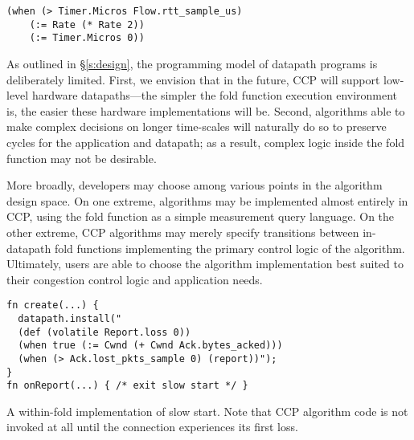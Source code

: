 {\footnotesize
\begin{verbatim}
(when (> Timer.Micros Flow.rtt_sample_us)
    (:= Rate (* Rate 2))
    (:= Timer.Micros 0))
\end{verbatim}
}

 As outlined in \S\ref{s:design}, the programming model of datapath programs is deliberately limited.
First, we envision that in the future, CCP will support low-level hardware datapaths---the simpler the fold function execution environment is, the easier these hardware implementations will be. Second, algorithms able to make complex decisions on longer time-scales will naturally do so to preserve cycles for the application and datapath; as a result, complex logic inside the fold function may not be desirable.

More broadly, developers may choose among various points in the algorithm design space. 
On one extreme, algorithms may be implemented almost entirely in CCP, using the fold function as a simple measurement query language.
On the other extreme, CCP algorithms may merely specify transitions between in-datapath fold functions implementing the primary control logic of the algorithm.
Ultimately, users are able to choose the algorithm implementation best suited to their congestion control logic and application needs.

\begin{listing}
{\footnotesize
\begin{verbatim}
fn create(...) {
  datapath.install("
  (def (volatile Report.loss 0))
  (when true (:= Cwnd (+ Cwnd Ack.bytes_acked)))
  (when (> Ack.lost_pkts_sample 0) (report))");
}
fn onReport(...) { /* exit slow start */ }
\end{verbatim}
}
\caption{A within-fold implementation of slow start. Note that CCP algorithm code is not invoked at all until the connection experiences its first loss.} \label{lst:ccp:ssfold}
\end{listing}
